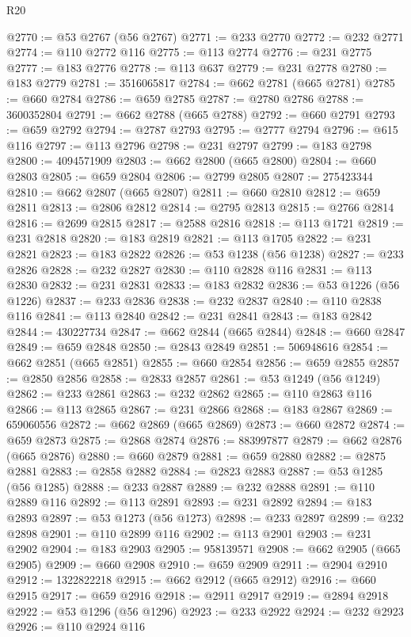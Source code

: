 \begin{lexlean}{R20}
\begin{coremodule}
@2770 := @53 @2767 (@56 @2767)
@2771 := @233 @2770
@2772 := @232 @2771
@2774 := @110 @2772 @116
@2775 := @113 @2774
@2776 := @231 @2775
@2777 := @183 @2776
@2778 := @113 @637
@2779 := @231 @2778
@2780 := @183 @2779
@2781 := 3516065817
@2784 := @662 @2781 (@665 @2781)
@2785 := @660 @2784
@2786 := @659 @2785
@2787 := @2780 @2786
@2788 := 3600352804
@2791 := @662 @2788 (@665 @2788)
@2792 := @660 @2791
@2793 := @659 @2792
@2794 := @2787 @2793
@2795 := @2777 @2794
@2796 := @615 @116
@2797 := @113 @2796
@2798 := @231 @2797
@2799 := @183 @2798
@2800 := 4094571909
@2803 := @662 @2800 (@665 @2800)
@2804 := @660 @2803
@2805 := @659 @2804
@2806 := @2799 @2805
@2807 := 275423344
@2810 := @662 @2807 (@665 @2807)
@2811 := @660 @2810
@2812 := @659 @2811
@2813 := @2806 @2812
@2814 := @2795 @2813
@2815 := @2766 @2814
@2816 := @2699 @2815
@2817 := @2588 @2816
@2818 := @113 @1721
@2819 := @231 @2818
@2820 := @183 @2819
@2821 := @113 @1705
@2822 := @231 @2821
@2823 := @183 @2822
@2826 := @53 @1238 (@56 @1238)
@2827 := @233 @2826
@2828 := @232 @2827
@2830 := @110 @2828 @116
@2831 := @113 @2830
@2832 := @231 @2831
@2833 := @183 @2832
@2836 := @53 @1226 (@56 @1226)
@2837 := @233 @2836
@2838 := @232 @2837
@2840 := @110 @2838 @116
@2841 := @113 @2840
@2842 := @231 @2841
@2843 := @183 @2842
@2844 := 430227734
@2847 := @662 @2844 (@665 @2844)
@2848 := @660 @2847
@2849 := @659 @2848
@2850 := @2843 @2849
@2851 := 506948616
@2854 := @662 @2851 (@665 @2851)
@2855 := @660 @2854
@2856 := @659 @2855
@2857 := @2850 @2856
@2858 := @2833 @2857
@2861 := @53 @1249 (@56 @1249)
@2862 := @233 @2861
@2863 := @232 @2862
@2865 := @110 @2863 @116
@2866 := @113 @2865
@2867 := @231 @2866
@2868 := @183 @2867
@2869 := 659060556
@2872 := @662 @2869 (@665 @2869)
@2873 := @660 @2872
@2874 := @659 @2873
@2875 := @2868 @2874
@2876 := 883997877
@2879 := @662 @2876 (@665 @2876)
@2880 := @660 @2879
@2881 := @659 @2880
@2882 := @2875 @2881
@2883 := @2858 @2882
@2884 := @2823 @2883
@2887 := @53 @1285 (@56 @1285)
@2888 := @233 @2887
@2889 := @232 @2888
@2891 := @110 @2889 @116
@2892 := @113 @2891
@2893 := @231 @2892
@2894 := @183 @2893
@2897 := @53 @1273 (@56 @1273)
@2898 := @233 @2897
@2899 := @232 @2898
@2901 := @110 @2899 @116
@2902 := @113 @2901
@2903 := @231 @2902
@2904 := @183 @2903
@2905 := 958139571
@2908 := @662 @2905 (@665 @2905)
@2909 := @660 @2908
@2910 := @659 @2909
@2911 := @2904 @2910
@2912 := 1322822218
@2915 := @662 @2912 (@665 @2912)
@2916 := @660 @2915
@2917 := @659 @2916
@2918 := @2911 @2917
@2919 := @2894 @2918
@2922 := @53 @1296 (@56 @1296)
@2923 := @233 @2922
@2924 := @232 @2923
@2926 := @110 @2924 @116

\end{coremodule}
\end{lexlean}
